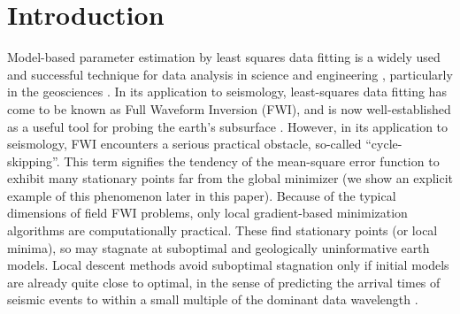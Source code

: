\begin{abstract}

\end{abstract}

\section{Introduction}
Model-based parameter estimation by least squares data fitting is a
widely used and successful technique for data analysis in science and
engineering \cite[]{Bertero:98,Vogel:02}, particularly in the
geosciences \cite[]{Parker:94,Tarantola:05}. In its application to
seismology, least-squares data fitting has come to be known as Full
Waveform Inversion (FWI), and is now well-established as a useful tool
for probing the earth's subsurface
\cite[]{VirieuxOperto:09,Fichtner:10,Schuster:17}. However, in its
application to seismology, FWI encounters a serious
practical obstacle, so-called ``cycle-skipping''. This term signifies
the tendency of the mean-square error function to exhibit many
stationary points far from the global minimizer (we
show an explicit example of this phenomenon later in this paper). Because of the
typical dimensions of field FWI problems, only local gradient-based
minimization algorithms are computationally practical. These find
stationary points (or local minima), so may stagnate at suboptimal and geologically
uninformative earth models. Local descent methods avoid suboptimal
stagnation only if initial models are already quite close to optimal,
in the sense of predicting the arrival times of seismic events to
within a small multiple of the dominant data wavelength
\cite[]{GauTarVir:86,VirieuxOperto:09,Plessix:10}.

